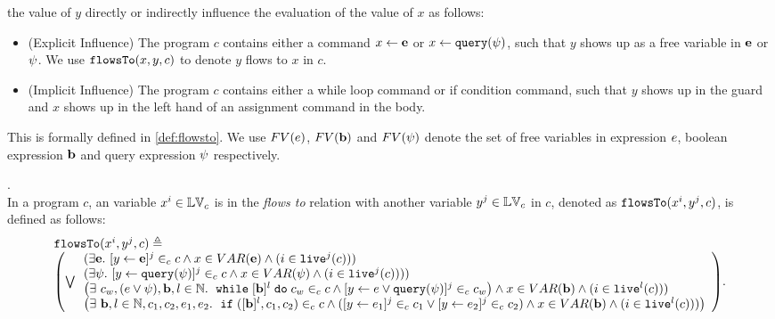 {the value of ${y}$ directly or indirectly influence the evaluation of the value of ${x}$ as follows:
%
\begin{itemize}
\item (Explicit Influence) The program ${c}$ contains either 
a command $\mathrel{ {x} \leftarrow {\boldsymbol{\mathbf{e}}} }$ or $\mathrel{ {x} \leftarrow {\tt query}({\psi}) }$,
such that ${y}$ shows up as a free variable in ${\boldsymbol{\mathbf{e}}}$ or ${\psi}$.
We use $\mathtt{flowsTo}({x, y, c})$ to denote ${y}$ flows to ${x}$ in ${c}$.
%
\item (Implicit Influence) The program ${c}$ contains either a while loop
command
or if condition command, such that ${y}$ shows up in the guard
and ${x}$ shows up in the left hand of an assignment command in the body.
\end{itemize}
%
This is formally defined in \ref{def:flowsto}.
We use $FV(e)$, $FV({\boldsymbol{\mathbf{b}}})$ and $FV(\psi)$ denote the set of free variables in 
expression $e$, boolean expression ${\boldsymbol{\mathbf{b}}}$ and query expression $\psi$ respectively.
%
\begin{defn}.
\label{def:flowsto}
\\
In a program  ${c}$,
an variable ${x^i}  \in \mathbb{LV}_c $ is in the \emph{flows to} relation with another variable ${y^j} \in \mathbb{LV}_c$
in ${c}$, denoted as $\mathtt{flowsTo}({x^i, y^j, c})$, is defined as follows:
%
\[
\begin{array}{l}
\flowsto({x^i, y^j, c}) \triangleq 
\\
\left( \bigvee
\begin{array}{l}
(\exists \sexpr . ~ [\assign{y}{\sexpr}]^j \in_{c} {c} 
\land {x} \in VAR(\sexpr) \land (i \in \live^j(c)))
\\
(\exists {\qexpr}. ~ [\assign{y}{\query({\qexpr})}]^j \in_{c} {c} 
\land x \in VAR({\qexpr}) \land (i \in \live^j(c))))
\\
\big(\exists  ~ {c_w}, {(\expr \lor \qexpr)}, \sbexpr, l \in \mathbb{N}. ~
	\ewhile [\sbexpr]^l \edo {c_w} \in_{c} {c}
	\land 
	[{\assign{y}{\expr \lor \query(\qexpr)}}]^{j} \in_{c}  {c_w}
\big) \land {x} \in VAR(\sbexpr) \land (i \in \live^l(c)))
\\
\big(
\exists ~ \sbexpr, l \in \mathbb{N}, {c_1}, {c_2}, {\expr}_1, {\expr}_2. ~
	\eif([\sbexpr]^l, {c_1}, {c_2}) \in_{c} {c} \land
	([{\assign{y}{\expr_1}}]^j \in_{c} {c_1} \lor 
	[{\assign{y}{\expr_2}}]^j \in_{c} {c_2})
\land {x} \in VAR(\sbexpr) \land (i \in \live^l(c)))
\big)
\end{array}
\right).
\end{array}
\]
%
\end{defn}
}
